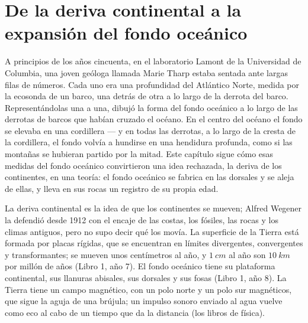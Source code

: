 \chapter{De la deriva continental a la expansión del fondo oceánico}\label{ch:g11:drift-to-spreading}

A principios de los años cincuenta, en el laboratorio Lamont de la
Universidad de Columbia, una joven geóloga llamada Marie Tharp estaba sentada ante largas filas de números. Cada uno era una
profundidad del Atlántico Norte, medida por la ecosonda de un barco, una
detrás de otra a lo largo de la derrota del barco. Representándolas una a
una, dibujó la forma del fondo oceánico a lo largo de las derrotas de barcos
que habían cruzado el océano. En el centro del océano el fondo se elevaba en
una cordillera --- y en todas las derrotas, a lo largo de la cresta de la
cordillera, el fondo volvía a hundirse en una hendidura profunda, como si las
montañas se hubieran partido por la mitad. Este capítulo sigue cómo esas
medidas del fondo oceánico convirtieron una idea rechazada, la deriva de los
continentes, en una teoría: el fondo oceánico se fabrica en las dorsales y se
aleja de ellas, y lleva en sus rocas un registro de su propia edad.

\begin{recall}
La deriva continental es la idea de que los continentes se mueven; Alfred
Wegener la defendió desde 1912 con el encaje de las costas, los fósiles, las
rocas y los climas antiguos, pero no supo decir qué los movía. La superficie
de la Tierra está formada por placas rígidas, que se encuentran en límites
divergentes, convergentes y transformantes; se mueven unos centímetros al
año, y $\qty{1}{cm}$ al año son $\qty{10}{km}$
por millón de años (Libro 1, año 7). El fondo oceánico tiene su plataforma
continental, sus llanuras abisales, sus dorsales y sus fosas (Libro 1,
año 8). La Tierra tiene un campo magnético, con un polo norte y un polo sur
magnéticos, que sigue la aguja de una brújula; un impulso sonoro enviado al
agua vuelve como eco al cabo de un tiempo que da la distancia (los libros de
física).
\end{recall}

